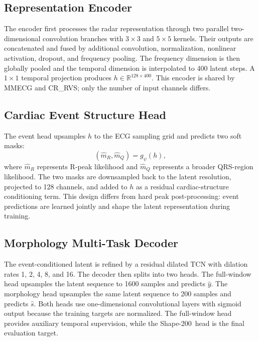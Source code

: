 \documentclass[lettersize,journal]{IEEEtran}
\newcommand{\shape}{Shape-200\xspace}
\newcommand{\crrvs}{CR\_RVS\xspace}
\begin{document}
\subsection{Representation Encoder}
The encoder first processes the radar representation through two parallel two-dimensional convolution branches with $3 \times 3$ and $5 \times 5$ kernels. Their outputs are concatenated and fused by additional convolution, normalization, nonlinear activation, dropout, and frequency pooling. The frequency dimension is then globally pooled and the temporal dimension is interpolated to 400 latent steps. A $1 \times 1$ temporal projection produces $h \in \mathbb{R}^{128 \times 400}$. This encoder is shared by MMECG and \crrvs; only the number of input channels differs.

\subsection{Cardiac Event Structure Head}
The event head upsamples $h$ to the ECG sampling grid and predicts two soft masks:
\begin{equation}
    (\hat{m}_R, \hat{m}_Q) = g_\psi(h),
\end{equation}
where $\hat{m}_R$ represents R-peak likelihood and $\hat{m}_Q$ represents a broader QRS-region likelihood. The two masks are downsampled back to the latent resolution, projected to 128 channels, and added to $h$ as a residual cardiac-structure conditioning term. This design differs from hard peak post-processing: event predictions are learned jointly and shape the latent representation during training.

\subsection{Morphology Multi-Task Decoder}
The event-conditioned latent is refined by a residual dilated TCN with dilation rates 1, 2, 4, 8, and 16. The decoder then splits into two heads. The full-window head upsamples the latent sequence to 1600 samples and predicts $\hat{y}$. The morphology head upsamples the same latent sequence to 200 samples and predicts $\hat{s}$. Both heads use one-dimensional convolutional layers with sigmoid output because the training targets are normalized. The full-window head provides auxiliary temporal supervision, while the \shape\ head is the final evaluation target.
\end{document}
